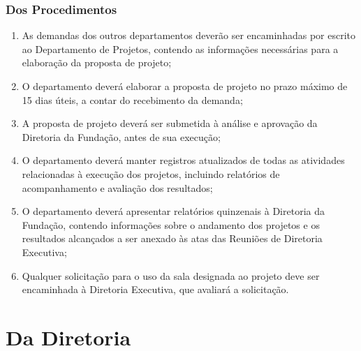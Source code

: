         \subsubsection{Dos Procedimentos}
        \begin{enumerate}
            \item As demandas dos outros departamentos deverão ser encaminhadas por escrito ao Departamento de Projetos, contendo as informações necessárias para a elaboração da proposta de projeto;
            \item O departamento deverá elaborar a proposta de projeto no prazo máximo de 15 dias úteis, a contar do recebimento da demanda;
            \item A proposta de projeto deverá ser submetida à análise e aprovação da Diretoria da Fundação, antes de sua execução;
            \item O departamento deverá manter registros atualizados de todas as atividades relacionadas à execução dos projetos, incluindo relatórios de acompanhamento e avaliação dos resultados;
            \item O departamento deverá apresentar relatórios quinzenais à Diretoria da Fundação, contendo informações sobre o andamento dos projetos e os resultados alcançados a ser anexado às atas das Reuniões de Diretoria Executiva;
            \item Qualquer solicitação para o uso da sala designada ao projeto deve ser encaminhada à Diretoria Executiva, que avaliará a solicitação.  
        \end{enumerate}
        
\section{Da Diretoria}
